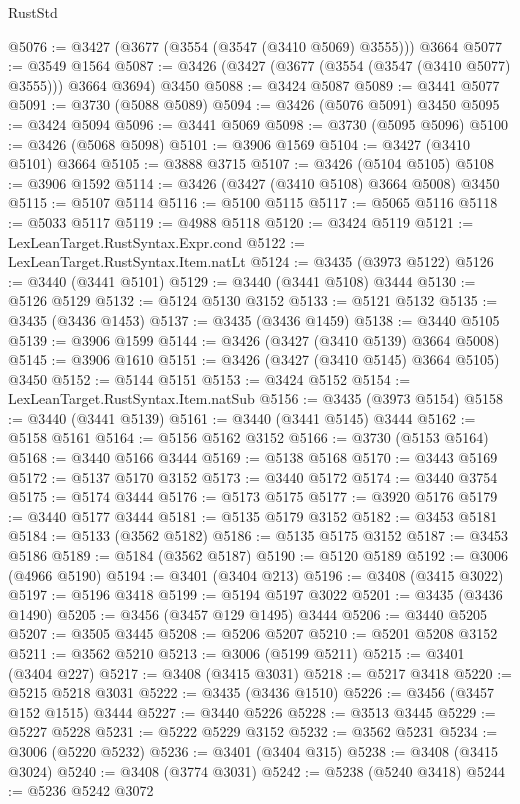\begin{lexlean}{RustStd}
\begin{coremodule}
@5076 := @3427 (@3677 (@3554 (@3547 (@3410 @5069) @3555))) @3664
@5077 := @3549 @1564
@5087 := @3426 (@3427 (@3677 (@3554 (@3547 (@3410 @5077) @3555))) @3664 @3694) @3450
@5088 := @3424 @5087
@5089 := @3441 @5077
@5091 := @3730 (@5088 @5089)
@5094 := @3426 (@5076 @5091) @3450
@5095 := @3424 @5094
@5096 := @3441 @5069
@5098 := @3730 (@5095 @5096)
@5100 := @3426 (@5068 @5098)
@5101 := @3906 @1569
@5104 := @3427 (@3410 @5101) @3664
@5105 := @3888 @3715
@5107 := @3426 (@5104 @5105)
@5108 := @3906 @1592
@5114 := @3426 (@3427 (@3410 @5108) @3664 @5008) @3450
@5115 := @5107 @5114
@5116 := @5100 @5115
@5117 := @5065 @5116
@5118 := @5033 @5117
@5119 := @4988 @5118
@5120 := @3424 @5119
@5121 := LexLeanTarget.RustSyntax.Expr.cond
@5122 := LexLeanTarget.RustSyntax.Item.natLt
@5124 := @3435 (@3973 @5122)
@5126 := @3440 (@3441 @5101)
@5129 := @3440 (@3441 @5108) @3444
@5130 := @5126 @5129
@5132 := @5124 @5130 @3152
@5133 := @5121 @5132
@5135 := @3435 (@3436 @1453)
@5137 := @3435 (@3436 @1459)
@5138 := @3440 @5105
@5139 := @3906 @1599
@5144 := @3426 (@3427 (@3410 @5139) @3664 @5008)
@5145 := @3906 @1610
@5151 := @3426 (@3427 (@3410 @5145) @3664 @5105) @3450
@5152 := @5144 @5151
@5153 := @3424 @5152
@5154 := LexLeanTarget.RustSyntax.Item.natSub
@5156 := @3435 (@3973 @5154)
@5158 := @3440 (@3441 @5139)
@5161 := @3440 (@3441 @5145) @3444
@5162 := @5158 @5161
@5164 := @5156 @5162 @3152
@5166 := @3730 (@5153 @5164)
@5168 := @3440 @5166 @3444
@5169 := @5138 @5168
@5170 := @3443 @5169
@5172 := @5137 @5170 @3152
@5173 := @3440 @5172
@5174 := @3440 @3754
@5175 := @5174 @3444
@5176 := @5173 @5175
@5177 := @3920 @5176
@5179 := @3440 @5177 @3444
@5181 := @5135 @5179 @3152
@5182 := @3453 @5181
@5184 := @5133 (@3562 @5182)
@5186 := @5135 @5175 @3152
@5187 := @3453 @5186
@5189 := @5184 (@3562 @5187)
@5190 := @5120 @5189
@5192 := @3006 (@4966 @5190)
@5194 := @3401 (@3404 @213)
@5196 := @3408 (@3415 @3022)
@5197 := @5196 @3418
@5199 := @5194 @5197 @3022
@5201 := @3435 (@3436 @1490)
@5205 := @3456 (@3457 @129 @1495) @3444
@5206 := @3440 @5205
@5207 := @3505 @3445
@5208 := @5206 @5207
@5210 := @5201 @5208 @3152
@5211 := @3562 @5210
@5213 := @3006 (@5199 @5211)
@5215 := @3401 (@3404 @227)
@5217 := @3408 (@3415 @3031)
@5218 := @5217 @3418
@5220 := @5215 @5218 @3031
@5222 := @3435 (@3436 @1510)
@5226 := @3456 (@3457 @152 @1515) @3444
@5227 := @3440 @5226
@5228 := @3513 @3445
@5229 := @5227 @5228
@5231 := @5222 @5229 @3152
@5232 := @3562 @5231
@5234 := @3006 (@5220 @5232)
@5236 := @3401 (@3404 @315)
@5238 := @3408 (@3415 @3024)
@5240 := @3408 (@3774 @3031)
@5242 := @5238 (@5240 @3418)
@5244 := @5236 @5242 @3072

\end{coremodule}
\end{lexlean}
